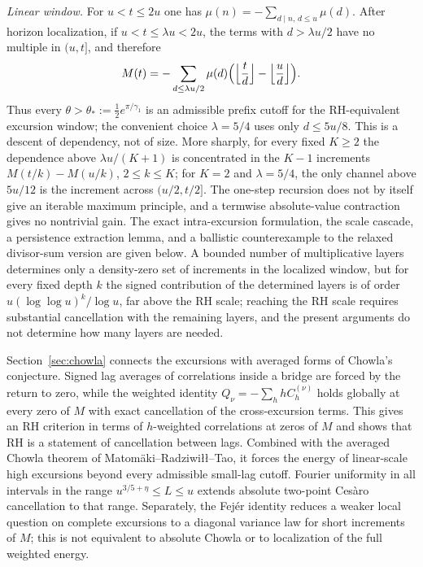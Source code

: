 \documentclass[11pt]{amsart}
\numberwithin{equation}{section}
\theoremstyle{plain}
\theoremstyle{definition}
\theoremstyle{remark}
\begin{document}
\smallskip\noindent\emph{Linear window.} For $u<t\le2u$ one has
$\mu(n)=-\sum_{d\mid n,\,d\le u}\mu(d)$.  After horizon localization,
if $u<t\le\lambda u<2u$, the terms with $d>\lambda u/2$ have no multiple
in $(u,t]$, and therefore
\[
M(t)=-\sum_{d\le\lambda u/2}\mu(d)
\Bigl(\Bigl\lfloor\frac td\Bigr\rfloor-\Bigl\lfloor\frac ud\Bigr\rfloor\Bigr).
\]
Thus every $\theta>\theta_*:=\frac12e^{\pi/\gamma_1}$ is an admissible
prefix cutoff for the RH-equivalent excursion window; the convenient choice
$\lambda=5/4$ uses only $d\le5u/8$.  This is a descent of dependency, not
of size.  More sharply, for every fixed $K\ge2$ the dependence above
$\lambda u/(K+1)$ is concentrated in the $K-1$ increments
$M(t/k)-M(u/k)$, $2\le k\le K$; for $K=2$ and $\lambda=5/4$, the only channel
above $5u/12$ is the increment across $(u/2,t/2]$.  The one-step recursion
does not by itself give an iterable maximum principle, and a termwise
absolute-value contraction gives no nontrivial gain.  The exact
intra-excursion formulation, the scale cascade, a persistence extraction
lemma, and a ballistic counterexample to the relaxed divisor-sum version are
given below. A bounded number of multiplicative layers determines only a
density-zero set of increments in the localized window, but for every fixed
depth $k$ the signed contribution of the determined layers is of order
$u(\log\log u)^k/\log u$, far above the RH scale; reaching the RH scale
requires substantial cancellation with the remaining layers, and the present
arguments do not determine how many layers are needed.

Section~\ref{sec:chowla} connects the excursions with averaged forms of
Chowla's conjecture. Signed lag averages of correlations inside a bridge are
forced by the return to zero, while the weighted identity
$Q_\nu=-\sum_hhC^{(\nu)}_h$ holds globally at every zero of $M$ with exact
cancellation of the cross-excursion terms. This gives an RH criterion in
terms of $h$-weighted correlations at zeros of $M$ and shows that RH is a
statement of cancellation between lags. Combined with the averaged Chowla theorem of Matom\"aki--Radziwi\l\l--Tao, it forces the energy of linear-scale high excursions beyond every admissible small-lag cutoff. Fourier uniformity in all intervals in the range
$u^{3/5+\eta}\le L\le u$ extends absolute two-point Ces\`aro cancellation to that range. Separately, the Fej\'er identity reduces a weaker local question on complete excursions to a diagonal variance law for short increments of $M$; this is not equivalent to absolute Chowla or to localization of the full weighted energy.
\end{document}

